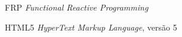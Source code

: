 \begin{siglas}
  \item[FRP] \emph{Functional Reactive Programming}
  \item[HTML5] \emph{HyperText Markup Language}, versão 5
\end{siglas}
